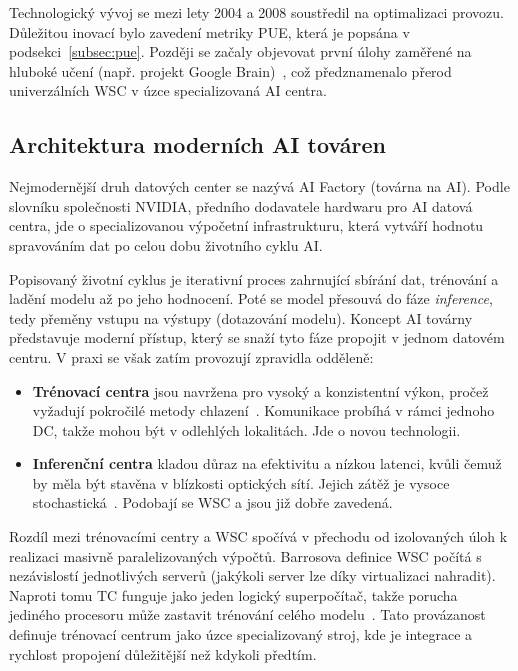 Technologický vývoj se mezi lety 2004 a 2008 soustředil na optimalizaci provozu. Důležitou inovací bylo zavedení metriky PUE, která je popsána v podsekci~\ref{subsec:pue}. Později se začaly objevovat první úlohy zaměřené na hluboké učení (např. projekt Google Brain)~\cite{ranganathan_twenty_2024}, což předznamenalo přerod univerzálních WSC v úzce specializovaná AI centra.

\subsection{Architektura moderních AI továren}
\label{subsec:ai_factory}

Nejmodernější druh datových center se nazývá AI Factory (továrna na AI). Podle slovníku společnosti NVIDIA, předního dodavatele hardwaru pro AI datová centra, jde o specializovanou výpočetní infrastrukturu, která vytváří hodnotu spravováním dat po celou dobu životního cyklu AI.~\cite{nvidia_what_2026}

Popisovaný životní cyklus je iterativní proces zahrnující sbírání dat, trénování a ladění modelu až po jeho hodnocení. Poté se model přesouvá do fáze \textit{inference}, tedy přeměny vstupu na výstupy (dotazování modelu). Koncept AI továrny představuje moderní přístup, který se snaží tyto fáze propojit v jednom datovém centru. V praxi se však zatím provozují zpravidla odděleně:

\begin{itemize}
    \item \textbf{Trénovací centra} jsou navržena pro vysoký a konzistentní výkon, pročež vyžadují pokročilé metody chlazení~\cite{cruzes_data_2025}. Komunikace probíhá v rámci jednoho DC, takže mohou být v odlehlých lokalitách. Jde o novou technologii.

    \item \textbf{Inferenční centra} kladou důraz na efektivitu a nízkou latenci, kvůli čemuž by měla být stavěna v blízkosti optických sítí. Jejich zátěž je vysoce stochastická~\cite{cruzes_data_2025, ginzburg-ganz_technical_2025}. Podobají se WSC a jsou již dobře zavedená.
\end{itemize}

Rozdíl mezi trénovacími centry a WSC spočívá v přechodu od izolovaných úloh k realizaci masivně paralelizovaných výpočtů. Barrosova definice WSC počítá s nezávislostí jednotlivých serverů (jakýkoli server lze díky virtualizaci nahradit). Naproti tomu TC funguje jako jeden logický superpočítač, takže porucha jediného procesoru může zastavit trénování celého modelu~\cite[s.~270]{barroso_data_2026}. Tato provázanost definuje trénovací centrum jako úzce specializovaný stroj, kde je integrace a rychlost propojení důležitější než kdykoli předtím.

